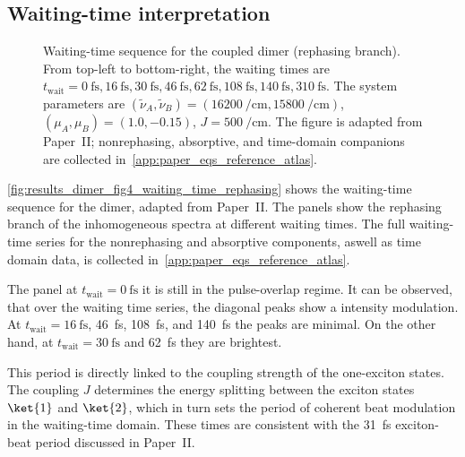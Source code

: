 \subsection{Waiting-time interpretation}
\label{subsec:results_dimer_waiting_time}

\begin{figure}[htbp]
  \centering
  \caption{Waiting-time sequence for the coupled dimer (rephasing branch). From top-left to bottom-right, the waiting times are $t_{\mathrm{wait}}=\SI{0}{\femto\second},\SI{16}{\femto\second},\SI{30}{\femto\second},\SI{46}{\femto\second},\SI{62}{\femto\second},\SI{108}{\femto\second},\SI{140}{\femto\second},\SI{310}{\femto\second}$. The system parameters are $(\tilde{\nu}_A,\tilde{\nu}_B)=(\SI{16200}{\per\centi\metre},\SI{15800}{\per\centi\metre})$, $(\mu_A,\mu_B)=(1.0,-0.15)$, $J=\SI{500}{\per\centi\metre}$. The figure is adapted from Paper~II; nonrephasing, absorptive, and time-domain companions are collected in~\autoref{app:paper_eqs_reference_atlas}.}
  \label{fig:results_dimer_fig4_waiting_time_rephasing}
\end{figure}

\autoref{fig:results_dimer_fig4_waiting_time_rephasing} shows the waiting-time sequence for the dimer, adapted from Paper~II. The panels show the rephasing branch of the inhomogeneous spectra at different waiting times. The full waiting-time series for the nonrephasing and absorptive components, aswell as time domain data, is collected in~\autoref{app:paper_eqs_reference_atlas}.

The panel at $t_{\mathrm{wait}}=\SI{0}{\femto\second}$ it is still in the pulse-overlap regime.
It can be observed, that over the waiting time series, the diagonal peaks show a intensity modulation. At $t_{\mathrm{wait}}=\SI{16}{\femto\second}$, \SI{46}{\femto\second}, \SI{108}{\femto\second}, and \SI{140}{\femto\second} the peaks are minimal. On the other hand, at $t_{\mathrm{wait}}=\SI{30}{\femto\second}$ and \SI{62}{\femto\second} they are brightest.

This period is directly linked to the coupling strength of the one-exciton states. The coupling $J$ determines the energy splitting between the exciton states $\ket{1}$ and $\ket{2}$, which in turn sets the period of coherent beat modulation in the waiting-time domain. These times are consistent with the \SI{31}{\femto\second} exciton-beat period discussed in Paper~II.

